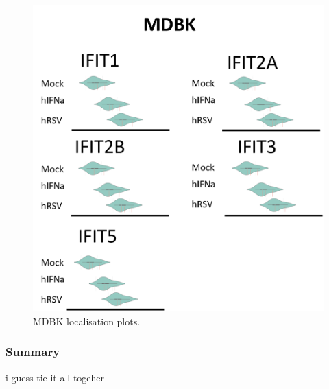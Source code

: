 \begin{figure}
    \centering
    \includegraphics[width=1\linewidth]{07. Chapter 2/Figs/03. Localisation/02. mdbk plots.png}
    \caption[MDBK localisation plots.]{MDBK localisation plots.}
    \label{MDBK localisation plots}
\end{figure}


\subsubsection*{Summary} \label{Summary bovine localisation}
i guess tie it all togeher
